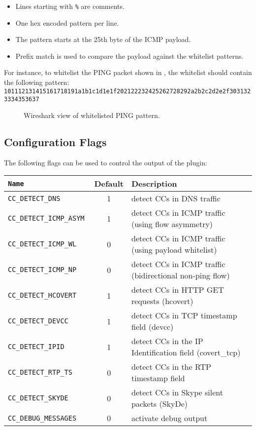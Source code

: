 \documentclass[documentation]{subfiles}
\begin{document}
\begin{itemize}
    \itemsep0em
    \item Lines starting with {\tt \%} are comments.
    \item One hex encoded pattern per line.
    \item The pattern starts at the 25th byte of the ICMP payload.
    \item Prefix match is used to compare the payload against the whitelist patterns.
\end{itemize}

For instance, to whitelist the PING packet shown in , the whitelist should
contain the following pattern: {\tt 101112131415161718191a1b1c1d1e1f202122232425262728292a2b2c2d2e2f3031323334353637}

\begin{figure}[hb]
  \centering
  \caption{Wireshark view of whitelisted PING pattern.}
  \label{fig:cc_ping_whitelist}
\end{figure}

\subsection{Configuration Flags}
The following flags can be used to control the output of the plugin:
\begin{longtable}{>{\tt}lcl}
    \toprule
    {\bf Name} & {\bf Default} & {\bf Description} \\
    \midrule\endhead%
    CC\_DETECT\_DNS        & 1 & detect CCs in DNS traffic\\
    CC\_DETECT\_ICMP\_ASYM & 1 & detect CCs in ICMP traffic (using flow asymmetry)\\
    CC\_DETECT\_ICMP\_WL   & 0 & detect CCs in ICMP traffic (using payload whitelist)\\
    CC\_DETECT\_ICMP\_NP   & 0 & detect CCs in ICMP traffic (bidirectional non-ping flow)\\
    CC\_DETECT\_HCOVERT    & 1 & detect CCs in HTTP GET requests (hcovert)\\
    CC\_DETECT\_DEVCC      & 1 & detect CCs in TCP timestamp field (devcc)\\
    CC\_DETECT\_IPID       & 1 & detect CCs in the IP Identification field (covert\_tcp)\\
    CC\_DETECT\_RTP\_TS    & 0 & detect CCs in the RTP timestamp field\\
    CC\_DETECT\_SKYDE      & 0 & detect CCs in Skype silent packets (SkyDe)\\
    CC\_DEBUG\_MESSAGES    & 0 & activate debug output\\
    \bottomrule
\end{longtable}
\end{document}
